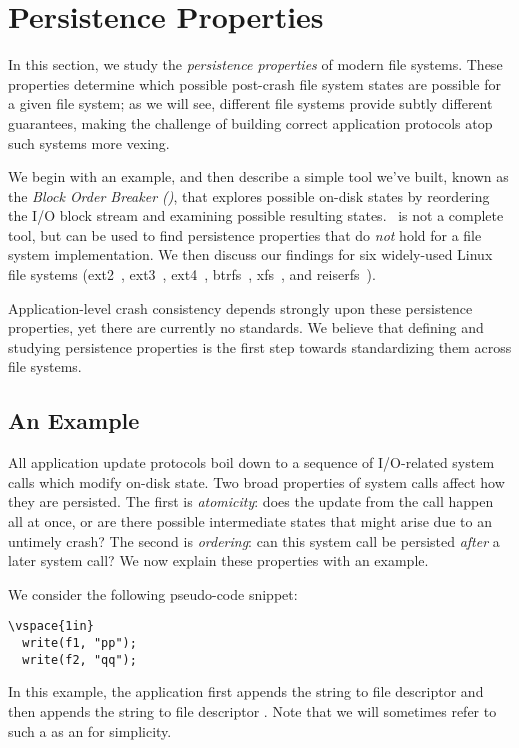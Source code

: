\section{Persistence Properties}
\label{sec-pp}

In this section, we study the {\em persistence properties} of modern file
systems. These properties determine which possible post-crash file system
states are possible for a given file system; as we will see, different file
systems provide subtly different guarantees, making the challenge of building
correct application protocols atop such systems more vexing.

We begin with an example, and then describe a simple tool we've built, known
as the {\em Block Order Breaker (\fstoolname)}, that explores possible on-disk states
by reordering the I/O block stream and examining possible resulting states.
\fstoolname\ is not a complete tool, but can be used to find persistence properties
that do {\em not} hold for a file system implementation. We then discuss our
findings for six widely-used Linux file systems (ext2~\cite{CardEtAl94-Ext2},
ext3~\cite{Tweedie98-JournalingExt2, Tweedie00-Ext3Talk},
ext4~\cite{TsoTweedie02-Ext23}, btrfs~\cite{Mason07-btrfs},
xfs~\cite{SweeneyEtAl96-XFS}, and reiserfs~\cite{Reiser04-ReiserFS}).

Application-level crash consistency depends strongly upon these persistence
properties, yet there are currently no standards.  We believe that defining
and studying persistence properties is the first step towards standardizing
them across file systems. 

\subsection{An Example}
\label{sec-ppexample}

All application update protocols boil down to a sequence of I/O-related system
calls which modify on-disk state. Two broad properties of system calls affect
how they are persisted. The first is \textit{atomicity}: does the update from
the call happen all at once, or are there possible intermediate states that
might arise due to an untimely crash?  The second is \textit{ordering}: can
this system call be persisted \textit{after} a later system call? We now
explain these properties with an example.



\noindent We consider the following pseudo-code snippet:
\vspace{-0.05in}
\begin{Verbatim}[fontsize=\footnotesize, baselinestretch=0.1, commandchars=\\\{\},
framesep=0pt]
  \vspace{1in}
  write(f1, "pp");
  write(f2, "qq");
\end{Verbatim}
\vspace{-0.1in}
In this example, the application first appends the string  to file
descriptor  and then appends the string  to file
descriptor . Note that we will sometimes refer to such a
 as an  for simplicity.

